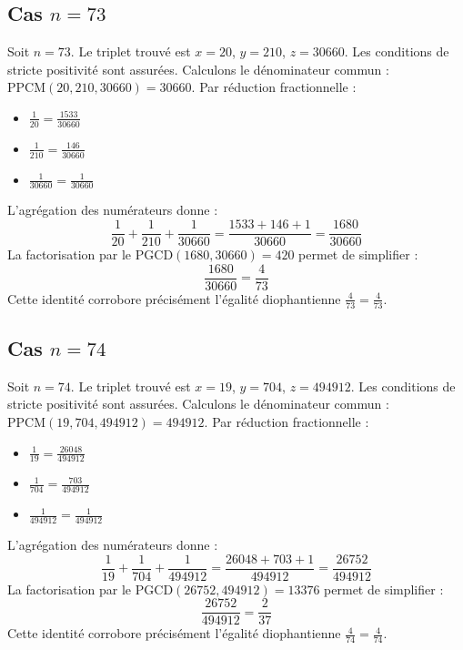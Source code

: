 \documentclass[11pt,a4paper]{article}
\begin{document}
\subsection{Cas $n = 73$}
Soit $n = 73$. Le triplet trouvé est $x = 20$, $y = 210$, $z = 30660$.
Les conditions de stricte positivité sont assurées.
Calculons le dénominateur commun : $\text{PPCM}(20, 210, 30660) = 30660$.
Par réduction fractionnelle :
\begin{itemize}
    \item $\frac{1}{20} = \frac{1533}{30660}$
    \item $\frac{1}{210} = \frac{146}{30660}$
    \item $\frac{1}{30660} = \frac{1}{30660}$
\end{itemize}
L'agrégation des numérateurs donne :
$$ \frac{1}{20} + \frac{1}{210} + \frac{1}{30660} = \frac{1533 + 146 + 1}{30660} = \frac{1680}{30660} $$
La factorisation par le $\text{PGCD}(1680, 30660) = 420$ permet de simplifier :
$$ \frac{1680}{30660} = \frac{4}{73} $$
Cette identité corrobore précisément l'égalité diophantienne $\frac{4}{73} = \frac{4}{73}$.

\subsection{Cas $n = 74$}
Soit $n = 74$. Le triplet trouvé est $x = 19$, $y = 704$, $z = 494912$.
Les conditions de stricte positivité sont assurées.
Calculons le dénominateur commun : $\text{PPCM}(19, 704, 494912) = 494912$.
Par réduction fractionnelle :
\begin{itemize}
    \item $\frac{1}{19} = \frac{26048}{494912}$
    \item $\frac{1}{704} = \frac{703}{494912}$
    \item $\frac{1}{494912} = \frac{1}{494912}$
\end{itemize}
L'agrégation des numérateurs donne :
$$ \frac{1}{19} + \frac{1}{704} + \frac{1}{494912} = \frac{26048 + 703 + 1}{494912} = \frac{26752}{494912} $$
La factorisation par le $\text{PGCD}(26752, 494912) = 13376$ permet de simplifier :
$$ \frac{26752}{494912} = \frac{2}{37} $$
Cette identité corrobore précisément l'égalité diophantienne $\frac{4}{74} = \frac{4}{74}$.
\end{document}
